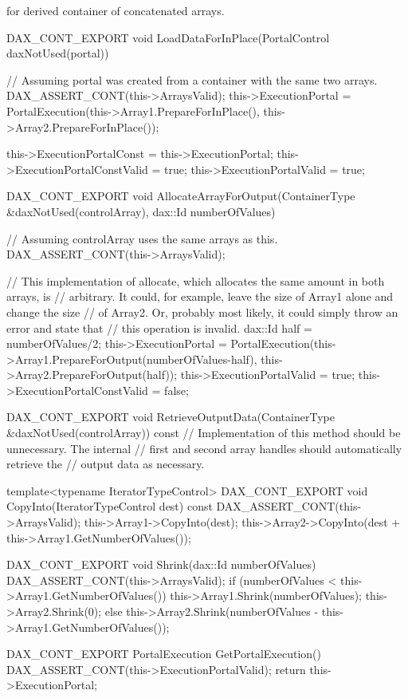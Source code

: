 \begin{daxexample}[ex:DerivedArrayTransfer]{ for derived container of concatenated arrays.}
{{{{  DAX_CONT_EXPORT
  void LoadDataForInPlace(PortalControl daxNotUsed(portal)) {
    // Assuming portal was created from a container with the same two arrays.
    DAX_ASSERT_CONT(this->ArraysValid);
    this->ExecutionPortal = PortalExecution(this->Array1.PrepareForInPlace(),
                                            this->Array2.PrepareForInPlace());

    this->ExecutionPortalConst = this->ExecutionPortal;
    this->ExecutionPortalConstValid = true;
    this->ExecutionPortalValid = true;
  }

  DAX_CONT_EXPORT
  void AllocateArrayForOutput(ContainerType &daxNotUsed(controlArray),
                              dax::Id numberOfValues) {
    // Assuming controlArray uses the same arrays as this.
    DAX_ASSERT_CONT(this->ArraysValid);

    // This implementation of allocate, which allocates the same amount in both arrays, is
    // arbitrary. It could, for example, leave the size of Array1 alone and change the size
    // of Array2. Or, probably most likely, it could simply throw an error and state that
    // this operation is invalid.
    dax::Id half = numberOfValues/2;
    this->ExecutionPortal
        = PortalExecution(this->Array1.PrepareForOutput(numberOfValues-half),
                          this->Array2.PrepareForOutput(half));
    this->ExecutionPortalValid = true;
    this->ExecutionPortalConstValid = false;
  }

  DAX_CONT_EXPORT
  void RetrieveOutputData(ContainerType &daxNotUsed(controlArray)) const {
    // Implementation of this method should be unnecessary. The internal
    // first and second array handles should automatically retrieve the
    // output data as necessary.
  }

  template<typename IteratorTypeControl>
  DAX_CONT_EXPORT
  void CopyInto(IteratorTypeControl dest) const {
    DAX_ASSERT_CONT(this->ArraysValid);
    this->Array1->CopyInto(dest);
    this->Array2->CopyInto(dest + this->Array1.GetNumberOfValues());
  }

  DAX_CONT_EXPORT
  void Shrink(dax::Id numberOfValues) {
    DAX_ASSERT_CONT(this->ArraysValid);
    if (numberOfValues < this->Array1.GetNumberOfValues())
      {
      this->Array1.Shrink(numberOfValues);
      this->Array2.Shrink(0);
      }
    else
      {
      this->Array2.Shrink(numberOfValues - this->Array1.GetNumberOfValues());
      }
  }

  DAX_CONT_EXPORT
  PortalExecution GetPortalExecution() {
    DAX_ASSERT_CONT(this->ExecutionPortalValid);
    return this->ExecutionPortal;
  }

}}}}
\end{daxexample}
